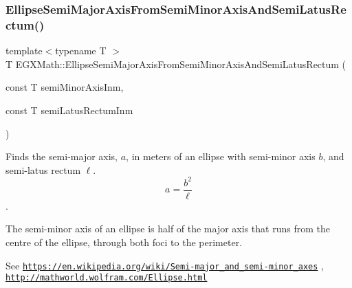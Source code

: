 \mbox{\label{group___e_g_x_math-_geometry-2_d-_ellipse-_semi_major_axis_ga1352fb9ee77a05d6b5d733c0fa048479}} 
\subsubsection{\texorpdfstring{Ellipse\+Semi\+Major\+Axis\+From\+Semi\+Minor\+Axis\+And\+Semi\+Latus\+Rectum()}{EllipseSemiMajorAxisFromSemiMinorAxisAndSemiLatusRectum()}}
{\footnotesize\ttfamily template$<$typename T $>$ \\
T E\+G\+X\+Math\+::\+Ellipse\+Semi\+Major\+Axis\+From\+Semi\+Minor\+Axis\+And\+Semi\+Latus\+Rectum (\begin{DoxyParamCaption}\item[{const T}]{semi\+Minor\+Axis\+Inm,  }\item[{const T}]{semi\+Latus\+Rectum\+Inm }\end{DoxyParamCaption})}



Finds the semi-\/major axis, $a$, in meters of an ellipse with semi-\/minor axis $b$, and semi-\/latus rectum $\ell$. \[ a= \frac{b^2}{\ell} \]. 

The semi-\/minor axis of an ellipse is half of the major axis that runs from the centre of the ellipse, through both foci to the perimeter.

See \href{https://en.wikipedia.org/wiki/Semi-major_and_semi-minor_axes}{\tt https\+://en.\+wikipedia.\+org/wiki/\+Semi-\/major\+\_\+and\+\_\+semi-\/minor\+\_\+axes} , \href{http://mathworld.wolfram.com/Ellipse.html}{\tt http\+://mathworld.\+wolfram.\+com/\+Ellipse.\+html}


